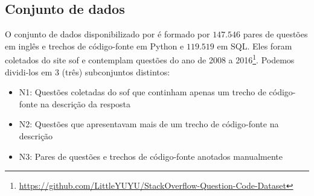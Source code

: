 \subsection{Conjunto de dados}
\label{sec:conjunto-dados}

O conjunto de dados disponibilizado por \cite{yao-2018} é formado por $\bm{147.546}$ pares de questões em inglês e trechos de código-fonte em Python e $\bm{119.519}$ em SQL. Eles foram coletados do site \Gls{sof} e contemplam questões do ano de 2008 a 2016\footnote{\url{https://github.com/LittleYUYU/StackOverflow-Question-Code-Dataset}}. Podemos dividi-los em 3 (três) subconjuntos distintos:

\begin{itemize}
    \item N1: Questões coletadas do \Gls{sof} que continham apenas um trecho de código-fonte na descrição da resposta
    \item N2: Questões que apresentavam mais de um trecho de código-fonte na descrição
    \item N3: Pares de questões e trechos de código-fonte anotados manualmente
\end{itemize}



